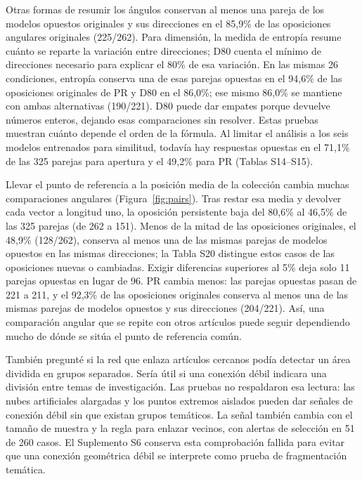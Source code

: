 \documentclass[12pt]{article}
\begin{document}
Otras formas de resumir los ángulos conservan al menos una pareja de los modelos opuestos originales y sus direcciones en el 85,9\% de las oposiciones angulares originales (225/262). Para dimensión, la medida de entropía resume cuánto se reparte la variación entre direcciones; D80 cuenta el mínimo de direcciones necesario para explicar el 80\% de esa variación. En las mismas 26 condiciones, entropía conserva una de esas parejas opuestas en el 94,6\% de las oposiciones originales de PR y D80 en el 86,0\%; ese mismo 86,0\% se mantiene con ambas alternativas (190/221). D80 puede dar empates porque devuelve números enteros, dejando esas comparaciones sin resolver. Estas pruebas muestran cuánto depende el orden de la fórmula. Al limitar el análisis a los seis modelos entrenados para similitud, todavía hay respuestas opuestas en el 71,1\% de las 325 parejas para apertura y el 49,2\% para PR (Tablas S14--S15).

Llevar el punto de referencia a la posición media de la colección cambia muchas comparaciones angulares (Figura~\ref{fig:pairs}). Tras restar esa media y devolver cada vector a longitud uno, la oposición persistente baja del 80,6\% al 46,5\% de las 325 parejas (de 262 a 151). Menos de la mitad de las oposiciones originales, el 48,9\% (128/262), conserva al menos una de las mismas parejas de modelos opuestos en las mismas direcciones; la Tabla S20 distingue estos casos de las oposiciones nuevas o cambiadas. Exigir diferencias superiores al 5\% deja solo 11 parejas opuestas en lugar de 96. PR cambia menos: las parejas opuestas pasan de 221 a 211, y el 92,3\% de las oposiciones originales conserva al menos una de las mismas parejas de modelos opuestos y sus direcciones (204/221). Así, una comparación angular que se repite con otros artículos puede seguir dependiendo mucho de dónde se sitúa el punto de referencia común.

También pregunté si la red que enlaza artículos cercanos podía detectar un área dividida en grupos separados. Sería útil si una conexión débil indicara una división entre temas de investigación. Las pruebas no respaldaron esa lectura: las nubes artificiales alargadas y los puntos extremos aislados pueden dar señales de conexión débil sin que existan grupos temáticos. La señal también cambia con el tamaño de muestra y la regla para enlazar vecinos, con alertas de selección en 51 de 260 casos. El Suplemento S6 conserva esta comprobación fallida para evitar que una conexión geométrica débil se interprete como prueba de fragmentación temática.
\end{document}
